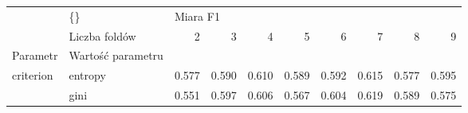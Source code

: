 \begin{tabular}{llrrrrrrrr}
\hline
          & \{\} & \multicolumn{8}{l}{Miara F1} \\
          & Liczba foldów &        2 &      3 &      4 &      5 &      6 &      7 &      8 &      9 \\
Parametr & Wartość parametru &          &        &        &        &        &        &        &        \\
\hline
criterion & entropy &    0.577 &  0.590 &  0.610 &  0.589 &  0.592 &  0.615 &  0.577 &  0.595 \\
          & gini &    0.551 &  0.597 &  0.606 &  0.567 &  0.604 &  0.619 &  0.589 &  0.575 \\
\hline
\end{tabular}
